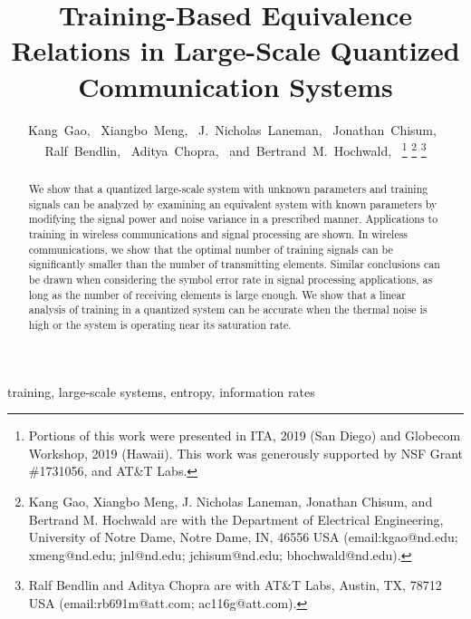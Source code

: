 \documentclass[12pt, draftclsnofoot,journal,onecolumn]{IEEEtran}
\begin{document}
\title{Training-Based Equivalence Relations in Large-Scale Quantized Communication Systems}
\author{Kang~Gao,~
Xiangbo~Meng,~
J.~Nicholas~Laneman,~ Jonathan~Chisum,~ Ralf~Bendlin,~ Aditya~Chopra,~ and~Bertrand~M.~Hochwald,~%
\thanks{Portions of this work were presented in ITA, 2019 (San Diego) and Globecom Workshop, 2019 (Hawaii). This work was generously supported by NSF Grant \#1731056, and AT\&T Labs.}
\thanks{Kang Gao, Xiangbo Meng, J. Nicholas Laneman, Jonathan Chisum, and Bertrand M. Hochwald are with the Department of Electrical Engineering, University of Notre Dame, Notre Dame, IN, 46556 USA (email:kgao@nd.edu; xmeng@nd.edu; jnl@nd.edu; jchisum@nd.edu; bhochwald@nd.edu).}
\thanks{Ralf Bendlin and Aditya Chopra are with AT\&T Labs, Austin, TX, 78712 USA (email:rb691m@att.com; ac116g@att.com).}}
\maketitle
\thispagestyle{plain}
\pagestyle{plain}
\begin{abstract}
We show that a quantized large-scale system with unknown parameters and training signals can be analyzed by examining an equivalent system with known parameters by modifying the signal power and noise variance in a prescribed manner.  Applications to training in wireless communications and signal processing are shown. In wireless communications, we show that the optimal number of training signals can be significantly smaller than the number of transmitting elements.  Similar conclusions can be drawn when considering the symbol error rate in signal processing applications, as long as the number of receiving elements is large enough. We show that a linear analysis of training in a quantized system can be accurate when the thermal noise is high or the system is operating near its saturation rate.
\end{abstract}
\begin{IEEEkeywords}
training, large-scale systems, entropy, information rates
\end{IEEEkeywords}
\IEEEpeerreviewmaketitle
\end{document}
